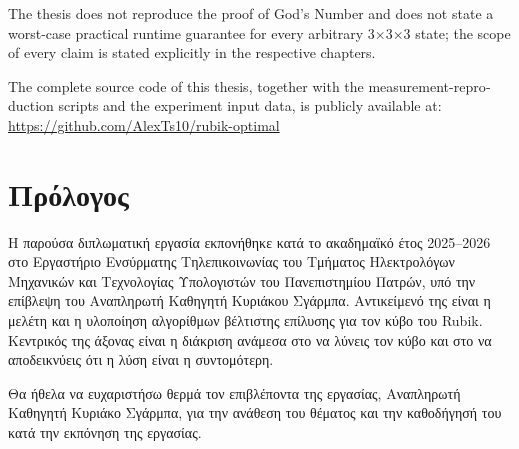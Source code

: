 \begin{english}
The thesis does not reproduce the proof of God's Number and does not state a worst-case practical runtime guarantee for every arbitrary 3×3×3 state; the scope of every claim is stated explicitly in the respective chapters.

The complete source code of this thesis, together with the measurement-reproduction scripts and the experiment input data, is publicly available at: \url{https://github.com/AlexTs10/rubik-optimal}
\end{english}

\chapter*{Πρόλογος}

Η παρούσα διπλωματική εργασία εκπονήθηκε κατά το ακαδημαϊκό έτος 2025--2026 στο Εργαστήριο Ενσύρματης Τηλεπικοινωνίας του Τμήματος Ηλεκτρολόγων Μηχανικών και Τεχνολογίας Υπολογιστών του Πανεπιστημίου Πατρών, υπό την επίβλεψη του Αναπληρωτή Καθηγητή Κυριάκου Σγάρμπα. Αντικείμενό της είναι η μελέτη και η υλοποίηση αλγορίθμων βέλτιστης επίλυσης για τον κύβο του Rubik. Κεντρικός της άξονας είναι η διάκριση ανάμεσα στο να λύνεις τον κύβο και στο να αποδεικνύεις ότι η λύση είναι η συντομότερη.

Θα ήθελα να ευχαριστήσω θερμά τον επιβλέποντα της εργασίας, Αναπληρωτή Καθηγητή Κυριάκο Σγάρμπα, για την ανάθεση του θέματος και την καθοδήγησή του κατά την εκπόνηση της εργασίας.
\clearpage
